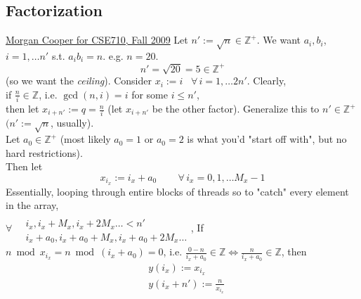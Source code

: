\documentclass[10pt]{amsart}
\begin{document}
\begin{multicols*}{2}
\section{Factorization}
\href{https://www.cse.buffalo.edu//faculty/miller/Courses/CSE710/Factorization_of_a_Large_number.pdf}{Morgan Cooper for CSE710, Fall 2009}
Let $n' := \sqrt{n} \in \mathbb{Z}^+$.  
We want $a_i, b_i$, $i=1,\dots n'$ s.t. $a_i b_i = n$.  
e.g. $n=20$.  
\[
n' = \sqrt{20} = 5 \in \mathbb{Z}^+
\]
(so we want the \emph{ceiling}).
Consider $x_i := i$ \, $ \forall \, i =  1, \dots 2n'$. 
Clearly, \\
if $\frac{n}{i} \in \mathbb{Z}$, i.e. $\gcd(n,i)=i$ for some $i\leq n'$, \\
then let $x_{i+n'} := q = \frac{n}{i}$ (let $x_{i+n'}$ be the other factor).  
Generalize this to 
$n' \in \mathbb{Z}^+$ $(n':= \sqrt{n}$, usually).  \\
Let $a_0 \in \mathbb{Z}^+$ (most likely $a_0 =1$ or $a_0 = 2$ is what you'd "start off with", but no hard restrictions).  \\
Then let 
\[
x_{i_x} := i_x + a_0 \qquad \, \forall \, i_x = 0,1,\dots M_x -1 
\]
Essentially, looping through entire blocks of threads so to "catch" every element in the array,  \\
$\forall \, \begin{aligned} & \quad \\ 
& i_x , i_x + M_x, i_x + 2M_x \dots < n' \\
& i_x + a_0, i_x + a_0 + M_x, i_x + a_0 + 2M_x \dots \end{aligned}$, 
If $n \bmod{x_{i_x}} = n \bmod{(i_x + a_0)} = 0$, i.e. $\frac{ 0 - n}{i_x + a_0} \in \mathbb{Z} \Longleftrightarrow \frac{n}{ i_x+ a_0 } \in \mathbb{Z}$, then 
\[
\begin{aligned}
& y(i_x) := x_{i_x} \\ 
& y(i_x + n') := \frac{n}{x_{i_x}}
\end{aligned}
\]

\end{multicols*}
\end{document}
